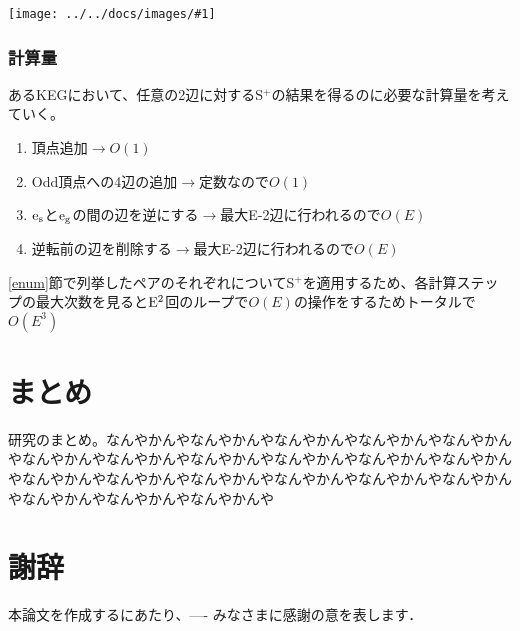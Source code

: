 \documentclass[11pt,a4j]{jarticle}
\newcommand{\splus}{S${}^\text{+}$}
\newcommand{\f}[1]{$\rm{#1}$} %
\newcommand{\image}[1]{\begin{center}\texttt{[image: ../../docs/images/\#1]}\end{center}}
\newcommand{\ra }{$\rightarrow$}
\begin{document}
\image{step2_2.jpg}

\subsubsection{計算量}
あるKEGにおいて、任意の2辺に対する\splus の結果を得るのに必要な計算量を考えていく。

\begin{enumerate}
    \item 頂点追加\ra  $O(1)$
    \item Odd頂点への4辺の追加\ra 定数なので$O(1)$
    \item \f{e_s}と\f{e_g}の間の辺を逆にする\ra 最大E-2辺に行われるので$O(E)$
    \item 逆転前の辺を削除する\ra 最大E-2辺に行われるので$O(E)$
\end{enumerate}

\ref{enum}節で列挙したペアのそれぞれについて\splus を適用するため、各計算ステップの最大次数を見ると\f{E^2}回のループで$O(E)$の操作をするためトータルで$O(E^3)$

\section{まとめ}
研究のまとめ。なんやかんやなんやかんやなんやかんやなんやかんやなんやかんやなんやかんやなんやかんやなんやかんやなんやかんやなんやかんやなんやかんやなんやかんやなんやかんやなんやかんやなんやかんやなんやかんやなんやかんやなんやかんやなんやかんやなんやかんや

\section*{謝辞} %
本論文を作成するにあたり、---- みなさまに感謝の意を表します．


\end{document}
